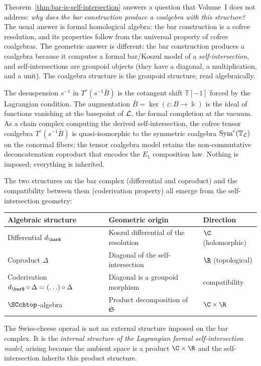 \begin{remark}
\label{rem:why-bar-exists}
Theorem~\ref{thm:bar-is-self-intersection} answers a question that
Volume~I does not address: \emph{why does the bar construction
produce a coalgebra with this structure?} The usual answer is
formal homological algebra: the bar construction is a cofree
resolution, and its properties follow from the universal property
of cofree coalgebras. The geometric answer is different: the bar
construction produces a coalgebra because it computes a formal
bar/Koszul model of a \emph{self-intersection}, and self-intersections
are groupoid objects (they have a diagonal, a multiplication, and a
unit). The coalgebra structure is the groupoid structure, read
algebraically.

The desuspension $s^{-1}$ in $T^c(s^{-1}\bar B)$ is the
cotangent shift $\mathbb{T}[-1]$ forced by the Lagrangian
condition. The augmentation $\bar B = \ker(\varepsilon\colon
B \to \Bbbk)$ is the ideal of functions vanishing at the basepoint
of $\mathcal L$, the formal completion at the vacuum. As a chain complex
computing the derived self-intersection, the cofree tensor coalgebra
$T^c(s^{-1}\bar B)$ is quasi-isomorphic to the symmetric coalgebra
$\operatorname{Sym}^c(\mathbb{T}_\mathcal L)$ on the conormal fibers; the tensor
coalgebra model retains the non-commutative deconcatenation coproduct
that encodes the $E_1$ composition law. Nothing is imposed;
everything is inherited.
\end{remark}

\begin{remark}
\label{rem:three-from-one}
The two structures on the bar complex (differential and
coproduct) and the compatibility between them (coderivation
property) all emerge from the self-intersection geometry:
\begin{center}
\renewcommand{\arraystretch}{1.3}
\begin{tabular}{lll}
\hline
\textbf{Algebraic structure} & \textbf{Geometric origin} &
\textbf{Direction} \\
\hline
Differential $d_{\barB}$ & Koszul differential of the
 resolution & $\C$ (holomorphic) \\
Coproduct $\Delta$ & Diagonal of the self-intersection &
 $\R$ (topological) \\
Coderivation $d_{\barB} \circ \Delta
 = (\ldots) \circ \Delta$ &
 Diagonal is a groupoid morphism &
 compatibility \\
$\SCchtop$-algebra & Product decomposition of $\mathfrak{S}$ &
 $\C \times \R$ \\
\hline
\end{tabular}
\end{center}
The Swiss-cheese operad is not an external structure imposed on the
bar complex. It is the \emph{internal structure of the Lagrangian
formal self-intersection model}, arising because the ambient space is a product
$\C \times \R$ and the self-intersection inherits this product
structure.
\end{remark}


